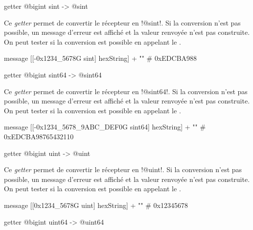 
\begin{galgas}
getter @bigint sint -> @sint
\end{galgas}

Ce \emph{getter} permet de convertir le récepteur en \ggs!@sint!. Si la conversion n'est pas possible, un message d'erreur est affiché et la valeur renvoyée n'est pas construite. On peut tester si la conversion est possible en appelant le .

\begin{galgas}
message [[-0x1234_5678G sint] hexString] + "\n" # 0xEDCBA988
\end{galgas}





\begin{galgas}
getter @bigint sint64 -> @sint64
\end{galgas}

Ce \emph{getter} permet de convertir le récepteur en \ggs!@sint64!. Si la conversion n'est pas possible, un message d'erreur est affiché et la valeur renvoyée n'est pas construite. On peut tester si la conversion est possible en appelant le .

\begin{galgas}
message [[-0x1234_5678_9ABC_DEF0G sint64] hexString] + "\n" # 0xEDCBA98765432110
\end{galgas}



\begin{galgas}
getter @bigint uint -> @uint
\end{galgas}

Ce \emph{getter} permet de convertir le récepteur en \ggs!@uint!. Si la conversion n'est pas possible, un message d'erreur est affiché et la valeur renvoyée n'est pas construite. On peut tester si la conversion est possible en appelant le .

\begin{galgas}
message [[0x1234_5678G uint] hexString] + "\n" # 0x12345678
\end{galgas}



\begin{galgas}
getter @bigint uint64 -> @uint64
\end{galgas}

